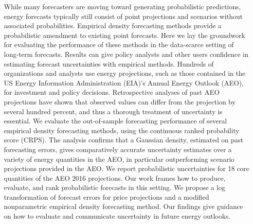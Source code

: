 While many forecasters are moving toward generating probabilistic predictions, energy forecasts typically still consist of point projections and scenarios without associated probabilities. Empirical density forecasting methods provide a probabilistic amendment to existing point forecasts. Here we lay the groundwork for evaluating the performance of these methods in the data-scarce setting of long-term forecasts. Results can give policy analysts and other users confidence in estimating forecast uncertainties with empirical methods. Hundreds of organizations and analysts use energy projections, such as those contained in the US Energy Information Administration (EIA)'s Annual Energy Outlook (AEO), for investment and policy decisions. Retrospective analyses of past AEO projections have shown that observed values can differ from the projection by several hundred percent, and thus a thorough treatment of uncertainty is essential. We evaluate the out-of-sample forecasting performance of several empirical density forecasting methods, using the continuous ranked probability score (CRPS). The analysis confirms that a Gaussian density, estimated on past forecasting errors, gives comparatively accurate uncertainty estimates over a variety of energy quantities in the AEO, in particular outperforming scenario projections provided in the AEO. We report probabilistic uncertainties for 18 core quantities of the AEO 2016 projections. Our work frames how to produce, evaluate, and rank probabilistic forecasts in this setting. We propose a log transformation of forecast errors for price projections and a modified nonparametric empirical density forecasting method. Our findings give guidance on how to evaluate and communicate uncertainty in future energy outlooks.
